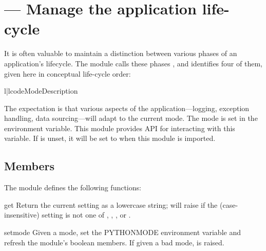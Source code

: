 \section{ ---
         Manage the application life-cycle}



It is often valuable to maintain a distinction between various phases of an
application's lifecycle. The  module calls these phases
, and identifies four of them, given here in conceptual life-cycle
order:

\begin{tableii}{l|l}{code}{Mode}{Description}
\end{tableii}


The expectation is that various aspects of the application---logging, exception
handling, data sourcing---will adapt to the current mode. The mode is set in the
 environment variable. This module provides API for
interacting with this variable. If  is unset, it will be set
to  when this module is imported.

\subsection{Members}

The module defines the following functions:

\begin{funcdesc}{get}{}
Return the current  setting as a lowercase string; will raise
 if the (case-insensitive) setting is not one of
, , , or .
\end{funcdesc}

\begin{funcdesc}{set}{mode}
Given a mode, set the PYTHONMODE environment variable and refresh the module's
boolean members. If given a bad mode,  is raised.
\end{funcdesc}

